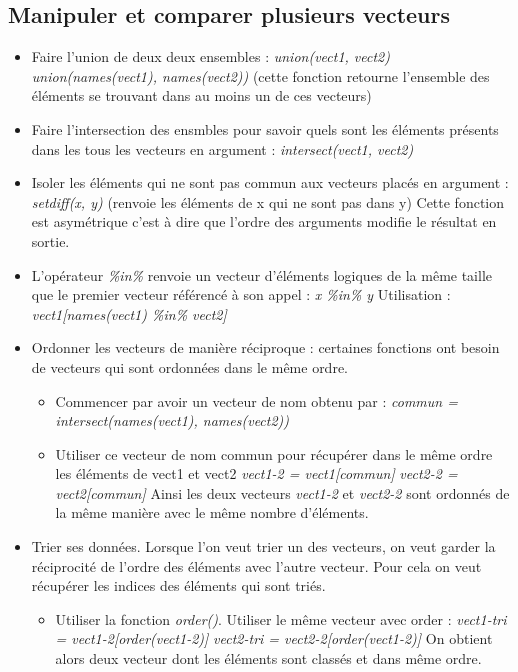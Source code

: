 \documentclass[12pt,a4paper]{article}
\begin{document}
\subsection{Manipuler et comparer plusieurs vecteurs}
\begin{itemize}
\item Faire l'union de deux deux ensembles : \textit{union(vect1, vect2)} 
\newline \textit{union(names(vect1), names(vect2))} (cette fonction retourne l'ensemble des éléments se trouvant dans au moins un de ces vecteurs)
\item Faire l'intersection des ensmbles pour savoir quels sont les éléments présents dans les tous les vecteurs en argument : \textit{intersect(vect1, vect2)}
\item Isoler les éléments qui ne sont pas commun aux vecteurs placés en argument : \textit{setdiff(x, y)} (renvoie les éléments de x qui ne sont pas dans y)
\newline Cette fonction est asymétrique c'est à dire que l'ordre des arguments modifie le résultat en sortie.
\item L'opérateur \textit{\%in\%} renvoie un vecteur d'éléments logiques de la même taille que le premier vecteur référencé à son appel : \textit{x \%in\% y}
\newline Utilisation : \textit{vect1[names(vect1) \%in\% vect2]}
\item Ordonner les vecteurs de manière réciproque : certaines fonctions ont besoin de vecteurs qui sont ordonnées dans le même ordre.
\begin{itemize}
\item Commencer par avoir un vecteur de nom obtenu par : 
\newline \textit{commun = intersect(names(vect1), names(vect2))}
\item Utiliser ce vecteur de nom commun pour récupérer dans le même ordre les éléments de vect1 et vect2
\newline \textit{vect1-2 = vect1[commun]}
\newline \textit{vect2-2 = vect2[commun]}
\newline Ainsi les deux vecteurs \textit{vect1-2} et \textit{vect2-2} sont ordonnés de la même manière avec le même nombre d'éléments.
\end{itemize}
\item Trier ses données. Lorsque l'on veut trier un des vecteurs, on veut garder la réciprocité de l'ordre des éléments avec l'autre vecteur. Pour cela on veut récupérer les indices des éléments qui sont triés.
\begin{itemize}
\item Utiliser la fonction \textit{order()}. Utiliser le même vecteur avec order :
\newline \textit{vect1-tri = vect1-2[order(vect1-2)]}
\newline \textit{vect2-tri = vect2-2[order(vect1-2)]}
\newline On obtient alors deux vecteur dont les éléments sont classés et dans même ordre.
\end{itemize}
\end{itemize}
\end{document}
